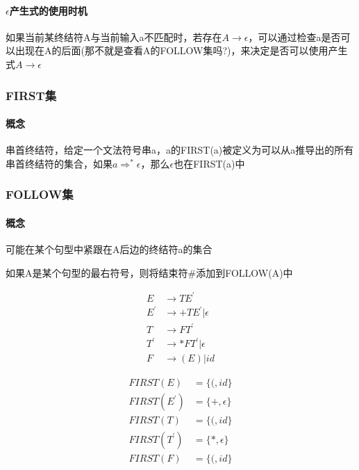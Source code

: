 \documentclass[UTF8]{ctexart} %
\begin{document}
\paragraph{$\epsilon$产生式的使用时机} 如果当前某终结符A与当前输入a不匹配时，若存在$A\rightarrow\epsilon$，可以通过检查a是否可以出现在A的后面(那不就是查看A的FOLLOW集吗?)，来决定是否可以使用产生式$A\rightarrow\epsilon$

\subsubsection{FIRST集}

\paragraph{概念} 串首终结符，给定一个文法符号串a，a的FIRST(a)被定义为可以从a推导出的所有串首终结符的集合，如果$a\Rightarrow^* \epsilon$，那么$\epsilon$也在FIRST(a)中

\subsubsection{FOLLOW集}

\paragraph{概念} 可能在某个句型中紧跟在A后边的终结符a的集合

如果A是某个句型的最右符号，则将结束符\#添加到FOLLOW(A)中

\begin{equation}
    \begin{aligned}
        E     & \rightarrow TE^{'}           \\
        E^{'} & \rightarrow +TE^{'}|\epsilon \\
        T     & \rightarrow FT^{'}           \\
        T^{'} & \rightarrow *FT^{'}|\epsilon \\
        F     & \rightarrow (E)|id
    \end{aligned}
\end{equation}

\begin{equation}
    \begin{aligned}
        FIRST(E)     & = \{(,id\}       \\
        FIRST(E^{'}) & = \{+,\epsilon\} \\
        FIRST(T)     & = \{(,id\}       \\
        FIRST(T^{'}) & = \{*,\epsilon\} \\
        FIRST(F)     & = \{(,id\}
    \end{aligned}
\end{equation}
\end{document}
